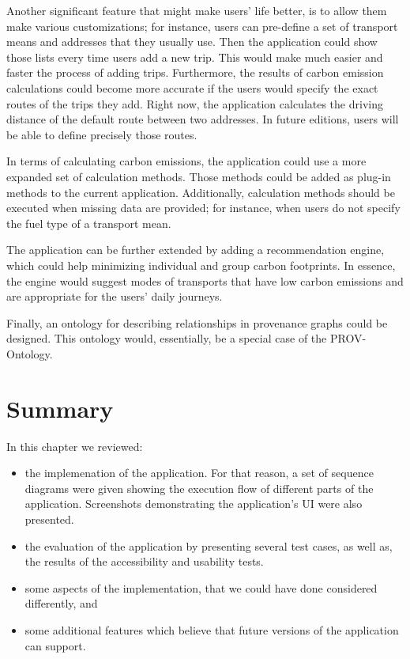 Another significant feature that might make users' life better, is to allow them make various customizations; for instance, users can pre-define a set of transport means and addresses that they usually use. Then the application could show those lists every time users add a new trip. This would make much easier and faster the process of adding trips. Furthermore, the results of carbon emission calculations could become more accurate if the users would specify the exact routes of the trips they add. Right now, the application calculates the driving distance of the default route between two addresses. In future editions, users will be able to define precisely those routes.

In terms of calculating carbon emissions, the application could use a more expanded set of calculation methods. Those methods could be added as plug-in methods to the current application. Additionally, calculation methods should be executed when missing data are provided; for instance, when users do not specify the fuel type of a transport mean.

The application can be further extended by adding a recommendation engine, which could help minimizing individual and group carbon footprints. In essence, the engine would suggest modes of transports that have low carbon emissions and are appropriate for the users' daily journeys.

Finally, an ontology for describing relationships in provenance graphs could be designed. This ontology would, essentially, be a special case of the PROV-Ontology.


\section{Summary}

In this chapter we reviewed:

\begin{itemize}
  \item 
        the implemenation of the application. For that reason, a set of sequence diagrams were given showing the execution flow of different parts of the application. Screenshots demonstrating the application's UI were also presented.
  \item
        the evaluation of the application by presenting several test cases, as well as, the results of the accessibility and usability tests. 
  \item
        some aspects of the implementation, that we could have done considered differently, and
  \item
        some additional features which believe that future versions of the application can support.
\end{itemize}

